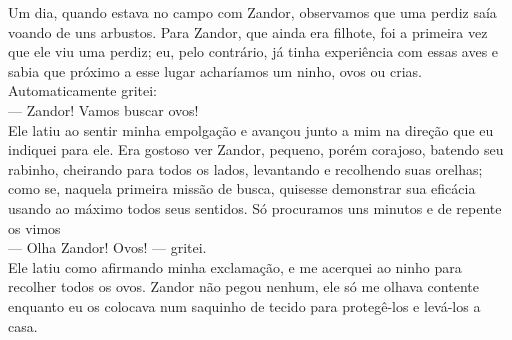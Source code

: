 Um dia, quando estava no campo com Zandor, observamos que uma perdiz saía voando de uns arbustos. Para Zandor, que ainda era filhote, foi a primeira vez que ele viu uma perdiz; eu, pelo contrário, já tinha experiência com essas aves e sabia que próximo a esse lugar acharíamos um ninho, ovos ou crias. 
Automaticamente gritei:\\\indent
--- Zandor! Vamos buscar ovos!\\\indent
Ele latiu ao sentir minha empolgação e avançou junto a mim na direção que eu indiquei para ele. 
Era gostoso ver Zandor, pequeno, porém corajoso, batendo seu rabinho, cheirando para todos os lados, levantando e recolhendo suas orelhas; como se, naquela primeira missão de busca, quisesse demonstrar sua eficácia usando ao máximo todos seus sentidos. 
Só procuramos uns minutos e de repente os vimos\\\indent
--- Olha Zandor! Ovos! --- gritei.\\\indent
Ele latiu como afirmando minha exclamação, e me acerquei ao ninho para recolher todos os ovos. Zandor não pegou nenhum, ele só me olhava contente enquanto eu os colocava num saquinho de tecido para protegê-los e levá-los a casa. 



